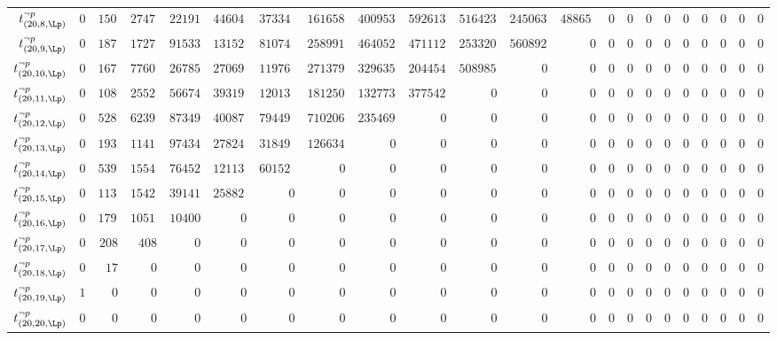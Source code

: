 \begin{tabular}{r|rrrrrrrrrrrrrrrrrrrrr}
  $t^{\neg p}_{(20,8,\Lp)}$ & $0$ & $1505449$ & $2747482178$ & $221914495674$ & $4460485367080$ & $37334447514910$ & $161658763233720$ & $400953509526766$ & $592613467985600$ & $516423860814708$ & $245063746679400$ & $48865477965480$ & $0$ & $0$ & $0$ & $0$ & $0$ & $0$ & $0$ & $0$ & $0$ \\
  $t^{\neg p}_{(20,9,\Lp)}$ & $0$ & $1879873$ & $1727435300$ & $91533127974$ & $1315218397702$ & $8107403031890$ & $25899151957728$ & $46405299441179$ & $47111257077012$ & $25332043854258$ & $5608927818780$ & $0$ & $0$ & $0$ & $0$ & $0$ & $0$ & $0$ & $0$ & $0$ & $0$ \\
  $t^{\neg p}_{(20,10,\Lp)}$ & $0$ & $1672260$ & $776088856$ & $26785875541$ & $270692708720$ & $1197679816845$ & $2713792133012$ & $3296358456384$ & $2044549225112$ & $508985566750$ & $0$ & $0$ & $0$ & $0$ & $0$ & $0$ & $0$ & $0$ & $0$ & $0$ & $0$ \\
  $t^{\neg p}_{(20,11,\Lp)}$ & $0$ & $1088846$ & $255230324$ & $5667409896$ & $39319731873$ & $120136854435$ & $181250344242$ & $132773330228$ & $37754209053$ & $0$ & $0$ & $0$ & $0$ & $0$ & $0$ & $0$ & $0$ & $0$ & $0$ & $0$ & $0$ \\
  $t^{\neg p}_{(20,12,\Lp)}$ & $0$ & $528832$ & $62391194$ & $873492429$ & $4008747240$ & $7944912435$ & $7102068048$ & $2354694672$ & $0$ & $0$ & $0$ & $0$ & $0$ & $0$ & $0$ & $0$ & $0$ & $0$ & $0$ & $0$ & $0$ \\
  $t^{\neg p}_{(20,13,\Lp)}$ & $0$ & $193877$ & $11410142$ & $97434607$ & $278242968$ & $318497730$ & $126634872$ & $0$ & $0$ & $0$ & $0$ & $0$ & $0$ & $0$ & $0$ & $0$ & $0$ & $0$ & $0$ & $0$ & $0$ \\
  $t^{\neg p}_{(20,14,\Lp)}$ & $0$ & $53909$ & $1554072$ & $7645254$ & $12113388$ & $6015282$ & $0$ & $0$ & $0$ & $0$ & $0$ & $0$ & $0$ & $0$ & $0$ & $0$ & $0$ & $0$ & $0$ & $0$ & $0$ \\
  $t^{\neg p}_{(20,15,\Lp)}$ & $0$ & $11352$ & $154236$ & $391419$ & $258825$ & $0$ & $0$ & $0$ & $0$ & $0$ & $0$ & $0$ & $0$ & $0$ & $0$ & $0$ & $0$ & $0$ & $0$ & $0$ & $0$ \\
  $t^{\neg p}_{(20,16,\Lp)}$ & $0$ & $1791$ & $10512$ & $10400$ & $0$ & $0$ & $0$ & $0$ & $0$ & $0$ & $0$ & $0$ & $0$ & $0$ & $0$ & $0$ & $0$ & $0$ & $0$ & $0$ & $0$ \\
  $t^{\neg p}_{(20,17,\Lp)}$ & $0$ & $208$ & $408$ & $0$ & $0$ & $0$ & $0$ & $0$ & $0$ & $0$ & $0$ & $0$ & $0$ & $0$ & $0$ & $0$ & $0$ & $0$ & $0$ & $0$ & $0$ \\
  $t^{\neg p}_{(20,18,\Lp)}$ & $0$ & $17$ & $0$ & $0$ & $0$ & $0$ & $0$ & $0$ & $0$ & $0$ & $0$ & $0$ & $0$ & $0$ & $0$ & $0$ & $0$ & $0$ & $0$ & $0$ & $0$ \\
  $t^{\neg p}_{(20,19,\Lp)}$ & $1$ & $0$ & $0$ & $0$ & $0$ & $0$ & $0$ & $0$ & $0$ & $0$ & $0$ & $0$ & $0$ & $0$ & $0$ & $0$ & $0$ & $0$ & $0$ & $0$ & $0$ \\
  $t^{\neg p}_{(20,20,\Lp)}$ & $0$ & $0$ & $0$ & $0$ & $0$ & $0$ & $0$ & $0$ & $0$ & $0$ & $0$ & $0$ & $0$ & $0$ & $0$ & $0$ & $0$ & $0$ & $0$ & $0$ & $0$ \\
\end{tabular}
